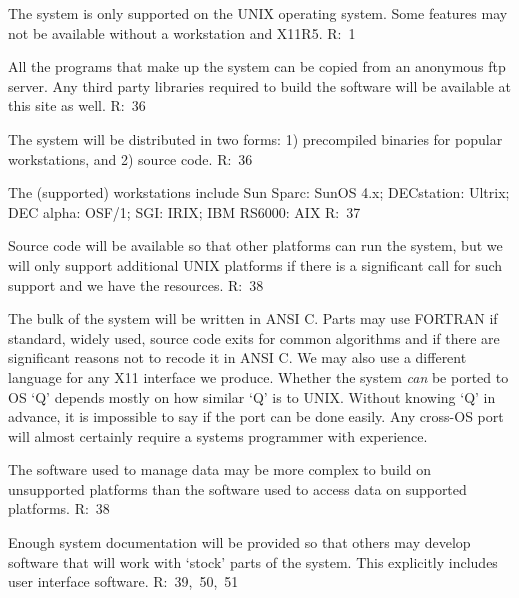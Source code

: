 \begin{list}{}{}
\item The system is only supported on the UNIX operating system. Some
features may not be available without a workstation and X11R5.
       R:~1
\begin{list}{--}{}

\item All the programs that make up the system can be copied from an 
       anonymous ftp server. Any third party libraries required to
       build the software will be available at this site as well.
       R:~36

\item The system will be distributed in two forms: 1) precompiled binaries
       for popular workstations, and 2) source code.
       R:~36

\begin{list}{--}{}

     \item The (supported) workstations include
           Sun Sparc: SunOS 4.x; DECstation: Ultrix; DEC alpha:
           OSF/1; SGI: IRIX; IBM RS6000: AIX
           R:~37

     \item Source code will be available so that other platforms can run
          the system, but we will only support additional UNIX
          platforms if there is a significant call for such support
          and we have the resources.
          R:~38

\end{list}

\item The bulk of the system will be written in ANSI C. Parts may use
       FORTRAN if standard, widely used, source code exits for common
       algorithms and if there are significant reasons not to recode
       it in ANSI C. We may also use a different language for any X11
       interface we produce. Whether the system {\em can\/} be ported to OS `Q'
       depends mostly on how similar `Q' is to UNIX. Without knowing `Q' in
       advance, it is impossible to say if the port can be done easily. Any
       cross-OS port will almost certainly require a systems programmer
       with experience.

\item The software used to manage data may be more complex to build on
       unsupported platforms than the software used to access data on
       supported platforms. R:~38

\item Enough system documentation will be provided so that others may develop
       software that will work with `stock' parts of the system. This
       explicitly includes user interface software.
       R:~39,~50,~51


\end{list}
\end{list}
